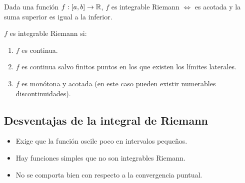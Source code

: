 \begin{prop}
    Dada una función $f: [a, b] \to \mathbb{R}$, $f$ es integrable Riemann $\iff$ es acotada y la suma superior es igual a la inferior.
\end{prop}

\begin{note}
    $f$ es integrable Riemann si: \begin{enumerate}
        \item $f$ es continua.
        \item $f$ es continua salvo finitos puntos en los que existen los límites laterales.
        \item $f$ es monótona y acotada (en este caso pueden existir numerables discontinuidades).
    \end{enumerate}
\end{note}

\subsection{Desventajas de la integral de Riemann}
\begin{itemize}
    \item Exige que la función oscile poco en intervalos pequeños.
    \item Hay funciones simples que no son integrables Riemann.
    \item No se comporta bien con respecto a la convergencia puntual.
\end{itemize}


